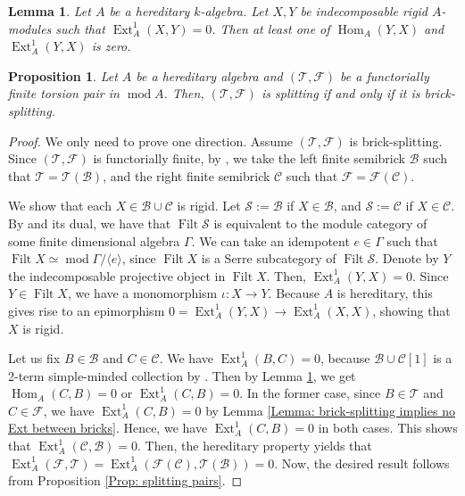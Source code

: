 \documentclass{amsart}
\theoremstyle{thmstyle}
\newtheorem{lemma}[thm]{Lemma}
\newtheorem{prop}[thm]{Proposition}
\theoremstyle{exstyle}
\theoremstyle{defstyle}
\theoremstyle{remstyle}
\theoremstyle{remstyle}
\newcommand{\Hom}{\operatorname{Hom}}
\newcommand{\Ext}{\operatorname{Ext}}
\DeclareMathOperator*{\modu}{mod}
\DeclareMathOperator*{\Filt}{Filt}
\begin{document}
\begin{lemma} \label{Lemma: Happel}
    Let $A$ be a hereditary $k$-algebra. Let $X,Y$ be indecomposable rigid $A$-modules such that $\Ext^1_A(X,Y)=0$. Then at least one of $\Hom_A(Y,X)$ and $\Ext^1_A(Y,X)$ is zero.
\end{lemma}
 
\begin{prop}
Let $A$ be a hereditary algebra and $(\mathcal{T},\mathcal{F})$ be a functorially finite torsion pair in $\modu A$. Then, $(\mathcal{T},\mathcal{F})$ is splitting if and only if it is brick-splitting.
\end{prop}

\begin{proof}
We only need to prove one direction. Assume  $(\mathcal{T},\mathcal{F})$ is brick-splitting. 
Since $(\mathcal{T},\mathcal{F})$ is functorially finite, by \cite[Proposition 2.9]{As}, we take the left finite semibrick $\mathcal{B}$ such that $\mathcal{T}=\mathcal{T}(\mathcal{B})$, and the right finite semibrick $\mathcal{C}$ such that $\mathcal{F}=\mathcal{F}(\mathcal{C})$.


We show that each $X\in\mathcal{B}\cup\mathcal{C}$ is rigid. Let $\mathcal{S}:=\mathcal{B}$ if $X\in\mathcal{B}$, and $\mathcal{S}:=\mathcal{C}$ if $X\in\mathcal{C}$.
By \cite[Theorem 2.27]{As} and its dual, we have that $\Filt \mathcal{S}$ is equivalent to the module category of some finite dimensional algebra $\Gamma$. We can take an idempotent $e \in \Gamma$ such that $\Filt X \simeq \modu \Gamma/\langle e \rangle$, since $\Filt X$ is a Serre subcategory of $\Filt\mathcal{S}$. Denote by $Y$ the indecomposable projective object in $\Filt X$. Then, $\Ext^1_A(Y,X)=0$. 
Since  $Y\in\Filt X$, we have a monomorphism $\iota: X \to Y$. Because $A$ is hereditary, this gives rise to an epimorphism $0=\Ext^1_A(Y,X) \to \Ext^1_A(X,X)$, showing that $X$ is rigid.

Let us fix $B \in \mathcal{B}$ and $C \in \mathcal{C}$. We have $\Ext_A^1(B,C)=0$, because $\mathcal{B} \cup \mathcal{C}[1]$ is a 2-term simple-minded collection by \cite[Theorem 3.3]{As}. 
Then by Lemma \ref{Lemma: Happel}, we get $\Hom_A(C,B)=0$ or $\Ext_A^1(C,B)=0$. In the former case, since $B \in \mathcal{T}$ and $C \in \mathcal{F}$, we have $\Ext_A^1(C,B)=0$ by Lemma \ref{Lemma: brick-splitting implies no Ext between bricks}. Hence, we have $\Ext^1_A(C,B) = 0$ in both cases. This shows that $\Ext^1_A(\mathcal{C}, \mathcal{B})=0$. 
Then, the hereditary property yields that $\Ext^1_A(\mathcal{F}, \mathcal{T})=\Ext^1_A(\mathcal{F}(\mathcal{C}), \mathcal{T}(\mathcal{B}))=0$. 
Now, the desired result follows from Proposition \ref{Prop: splitting pairs}.
\end{proof}
\end{document}
